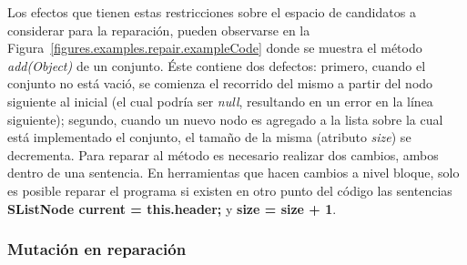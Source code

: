 Los efectos que tienen estas restricciones sobre el espacio de candidatos a considerar para la reparaci\'on, pueden observarse en la Figura~\ref{figures.examples.repair.exampleCode} donde se muestra el m\'etodo \emph{add(Object)} de un conjunto. \'Este contiene dos defectos: primero, cuando el conjunto no est\'a vaci\'o, se comienza el recorrido del mismo a partir del nodo siguiente al inicial (el cual podr\'ia ser \emph{null}, resultando en un error en la l\'inea siguiente); segundo, cuando un nuevo nodo es agregado a la lista sobre la cual est\'a implementado el conjunto, el tama\~no de la misma (atributo \emph{size}) se decrementa. Para reparar al m\'etodo es necesario realizar dos cambios, ambos dentro de una sentencia. En herramientas que hacen cambios a nivel bloque, solo es posible reparar el programa si existen en otro punto del c\'odigo las sentencias \textbf{SListNode current = this.header;} y \textbf{size = size + 1}.


\subsubsection{Mutaci\'on en reparaci\'on}
\label{sec:repair.granularity.mutation}

